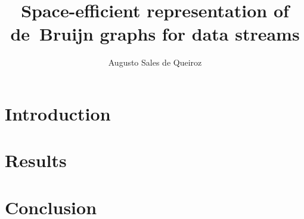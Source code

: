 \documentclass[bsc,en]{ufpethesis}
\institute{Centro de Informática}
\author{Augusto Sales de Queiroz}
\title{Space-efficient representation of de~Bruijn graphs for data streams}
\begin{document}
    \linenumbers
    \frontmatter
    \frontpage
    \presentationpage

    \mainmatter
    \chapter{Introduction}
    
    
    \chapter{Results}
    \chapter{Conclusion}

    \backmatter
    
    
\end{document}
